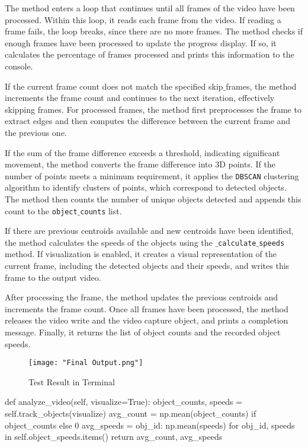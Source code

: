 \documentclass{article}
\begin{document}
	The method enters a loop that continues until all frames of the video have been processed. Within this loop, it reads each frame from the video. If reading a frame fails, the loop breaks, since there are no more frames. The method checks if enough frames have been processed to update the progress display. If so, it calculates the percentage of frames processed and prints this information to the console.
	
	If the current frame count does not match the specified skip$\_$frames, the method increments the frame count and continues to the next iteration, effectively skipping frames. For processed frames, the method first preprocesses the frame to extract edges and then computes the difference between the current frame and the previous one.
	
	If the sum of the frame difference exceeds a threshold, indicating significant movement, the method converts the frame difference into 3D points. If the number of points meets a minimum requirement, it applies the \texttt{DBSCAN} clustering algorithm to identify clusters of points, which correspond to detected objects. The method then counts the number of unique objects detected and appends this count to the \texttt{object$\_$counts} list.
	
	If there are previous centroids available and new centroids have been identified, the method calculates the speeds of the objects using the \texttt{$\_$calculate$\_$speeds} method. If visualization is enabled, it creates a visual representation of the current frame, including the detected objects and their speeds, and writes this frame to the output video.
	
	After processing the frame, the method updates the previous centroids and increments the frame count. Once all frames have been processed, the method releases the video write and the video capture object, and prints a completion message. Finally, it returns the list of object counts and the recorded object speeds.

	\begin{figure}[H]
		\centering
		\texttt{[image: "Final Output.png"]}
		\caption{Test Result in Terminal}
	\end{figure}
	
	\begin{python}
def analyze_video(self, visualize=True):
	object_counts, speeds = self.track_objects(visualize)
	avg_count = np.mean(object_counts) if object_counts else 0
	avg_speeds = {obj_id: np.mean(speeds) for obj_id, speeds in self.object_speeds.items()}
	return avg_count, avg_speeds \end{python}	
\end{document}
